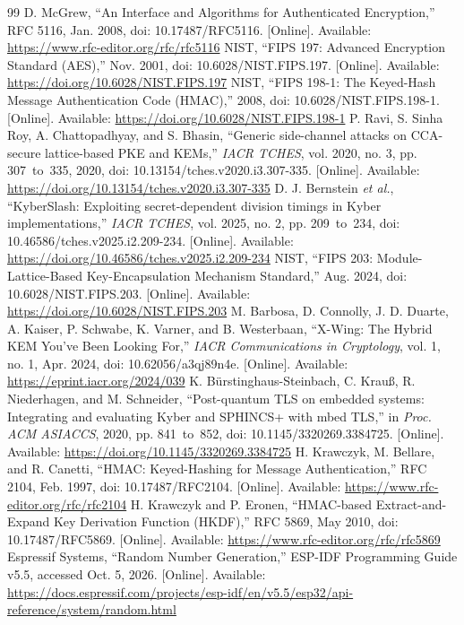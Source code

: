 \documentclass[pdflatex,sn-mathphys-num]{sn-jnl}
\begin{document}
\begin{thebibliography}{99}
 D. McGrew, ``An Interface and Algorithms for Authenticated Encryption,'' RFC 5116, Jan. 2008, doi: 10.17487/RFC5116. [Online]. Available: \url{https://www.rfc-editor.org/rfc/rfc5116}
 NIST, ``FIPS 197: Advanced Encryption Standard (AES),'' Nov. 2001, doi: 10.6028/NIST.FIPS.197. [Online]. Available: \url{https://doi.org/10.6028/NIST.FIPS.197}
 NIST, ``FIPS 198-1: The Keyed-Hash Message Authentication Code (HMAC),'' 2008, doi: 10.6028/NIST.FIPS.198-1. [Online]. Available: \url{https://doi.org/10.6028/NIST.FIPS.198-1}
 P. Ravi, S. Sinha Roy, A. Chattopadhyay, and S. Bhasin, ``Generic side-channel attacks on CCA-secure lattice-based PKE and KEMs,'' \textit{IACR TCHES}, vol. 2020, no. 3, pp. 307~to~335, 2020, doi: 10.13154/tches.v2020.i3.307-335. [Online]. Available: \url{https://doi.org/10.13154/tches.v2020.i3.307-335}
 D. J. Bernstein \textit{et al.}, ``KyberSlash: Exploiting secret-dependent division timings in Kyber implementations,'' \textit{IACR TCHES}, vol. 2025, no. 2, pp. 209~to~234, doi: 10.46586/tches.v2025.i2.209-234. [Online]. Available: \url{https://doi.org/10.46586/tches.v2025.i2.209-234}
 NIST, ``FIPS 203: Module-Lattice-Based Key-Encapsulation Mechanism Standard,'' Aug. 2024, doi: 10.6028/NIST.FIPS.203. [Online]. Available: \url{https://doi.org/10.6028/NIST.FIPS.203}
 M. Barbosa, D. Connolly, J. D. Duarte, A. Kaiser, P. Schwabe, K. Varner, and B. Westerbaan, ``X-Wing: The Hybrid KEM You've Been Looking For,'' \textit{IACR Communications in Cryptology}, vol. 1, no. 1, Apr. 2024, doi: 10.62056/a3qj89n4e. [Online]. Available: \url{https://eprint.iacr.org/2024/039}
 K. B{\"u}rstinghaus-Steinbach, C. Krau{\ss}, R. Niederhagen, and M. Schneider, ``Post-quantum TLS on embedded systems: Integrating and evaluating Kyber and SPHINCS+ with mbed TLS,'' in \textit{Proc. ACM ASIACCS}, 2020, pp. 841~to~852, doi: 10.1145/3320269.3384725. [Online]. Available: \url{https://doi.org/10.1145/3320269.3384725}
 H. Krawczyk, M. Bellare, and R. Canetti, ``HMAC: Keyed-Hashing for Message Authentication,'' RFC 2104, Feb. 1997, doi: 10.17487/RFC2104. [Online]. Available: \url{https://www.rfc-editor.org/rfc/rfc2104}
 H. Krawczyk and P. Eronen, ``HMAC-based Extract-and-Expand Key Derivation Function (HKDF),'' RFC 5869, May 2010, doi: 10.17487/RFC5869. [Online]. Available: \url{https://www.rfc-editor.org/rfc/rfc5869}
 Espressif Systems, ``Random Number Generation,'' ESP-IDF Programming Guide v5.5, accessed Oct. 5, 2026. [Online]. Available: \url{https://docs.espressif.com/projects/esp-idf/en/v5.5/esp32/api-reference/system/random.html}

\end{thebibliography}
\end{document}

